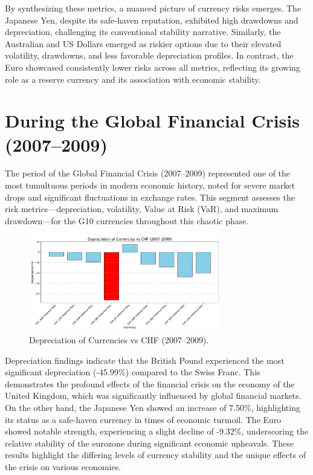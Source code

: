 \documentclass[11pt,a4paper,english,oneside]{book}
\begin{document}
By synthesizing these metrics, a nuanced picture of currency risks emerges. The Japanese Yen, despite its safe-haven reputation, exhibited high drawdowns and depreciation, challenging its conventional stability narrative. Similarly, the Australian and US Dollars emerged as riskier options due to their elevated volatility, drawdowns, and less favorable depreciation profiles. In contrast, the Euro showcased consistently lower risks across all metrics, reflecting its growing role as a reserve currency and its association with economic stability.

\section{During the Global Financial Crisis (2007–2009)}
The period of the Global Financial Crisis (2007–2009) represented one of the most tumultuous periods in modern economic history, noted for severe market drops and significant fluctuations in exchange rates. This segment assesses the risk metrics—depreciation, volatility, Value at Risk (VaR), and maximum drawdown—for the G10 currencies throughout this chaotic phase.

\begin{figure}[h!]
    \centering
    \includegraphics[width=0.75\textwidth]{images/depreciation_2007_2009.pdf}
    \caption{Depreciation of Currencies vs CHF (2007--2009).}
    \label{fig:depreciation_2007_2009}
\end{figure}

Depreciation findings indicate that the British Pound experienced the most significant depreciation (-45.99\%) compared to the Swiss Franc. This demonstrates the profound effects of the financial crisis on the economy of the United Kingdom, which was significantly influenced by global financial markets. On the other hand, the Japanese Yen showed an increase of 7.50\%, highlighting its status as a safe-haven currency in times of economic turmoil. The Euro showed notable strength, experiencing a slight decline of -9.32\%, underscoring the relative stability of the eurozone during significant economic upheavals. These results highlight the differing levels of currency stability and the unique effects of the crisis on various economies.
\end{document}
